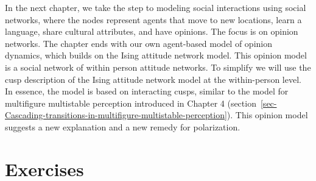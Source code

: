 \documentclass[
  a4paper,
  DIV=11,
  numbers=noendperiod,
  oneside]{scrreprt}
\begin{document}
In the next chapter, we take the step to modeling social interactions
using social networks, where the nodes represent agents that move to new
locations, learn a language, share cultural attributes, and have
opinions. The focus is on opinion networks. The chapter ends with our
own agent-based model of opinion dynamics, which builds on the Ising
attitude network model. This opinion model is a social network of within
person attitude networks. To simplify we will use the cusp description
of the Ising attitude network model at the within-person level. In
essence, the model is based on interacting cusps, similar to the model
for multifigure multistable perception introduced in Chapter 4
(section~\ref{sec-Cascading-transitions-in-multifigure-multistable-perception}).
This opinion model suggests a new explanation and a new remedy for
polarization.

\section{Exercises}\label{sec-Exercises-ch6}
\end{document}
